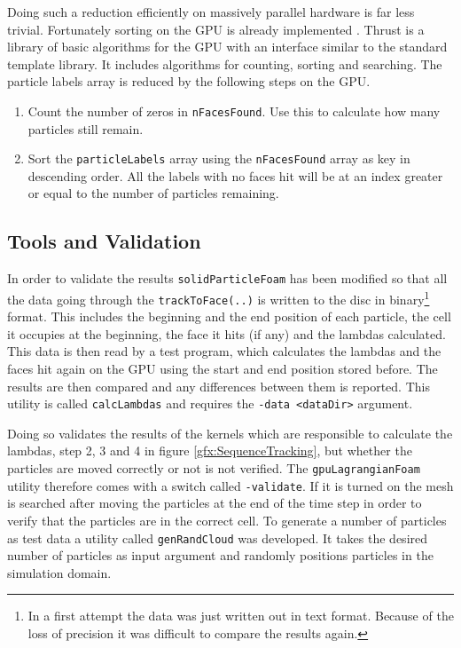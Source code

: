 Doing such a reduction efficiently on massively parallel hardware is far less trivial. Fortunately sorting on the GPU is already implemented \cite{thrustRadixSort}. Thrust \cite{thrust} is a library of basic algorithms for the GPU with an interface similar to the standard template library. It includes algorithms for counting, sorting and searching. The particle labels array is reduced by the following steps on the GPU.

\begin{enumerate}
    
    \item Count the number of zeros in \verb+nFacesFound+. Use this to calculate how many particles still remain.
    
    \item Sort the \verb+particleLabels+ array using the \verb+nFacesFound+ array as key in descending order. All the labels with no faces hit will be at an index greater or equal to the number of particles remaining.
    
\end{enumerate}

\subsection{Tools and Validation}

In order to validate the results \verb+solidParticleFoam+ has been modified so that all the data going through the \verb+trackToFace(..)+ is written to the disc in binary\footnote{In a first attempt the data was just written out in text format. Because of the loss of precision it was difficult to compare the results again.} format. This includes the beginning and the end position of each particle, the cell it occupies at the beginning, the face it hits (if any) and the lambdas calculated. This data is then read by a test program, which calculates the lambdas and the faces hit again on the GPU using the start and end position stored before. The results are then compared and any differences between them is reported. This utility is called \verb+calcLambdas+ and requires the \verb+-data <dataDir>+ argument.

Doing so validates the results of the kernels which are responsible to calculate the lambdas, step 2, 3 and 4 in figure \ref{gfx:SequenceTracking}, but whether the particles are moved correctly or not is not verified. The \verb+gpuLagrangianFoam+ utility therefore comes with a switch called \verb+-validate+. If it is turned on the mesh is searched after moving the particles at the end of the time step in order to verify that the particles are in the correct cell. To generate a number of particles as test data a utility called \verb+genRandCloud+ was developed. It takes the desired number of particles as input argument and randomly positions particles in the simulation domain.

